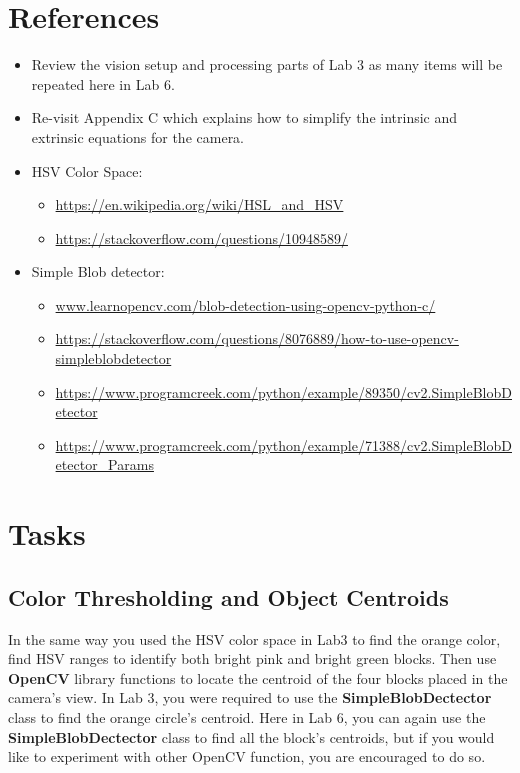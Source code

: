 \section{References}
\begin{itemize}
	\item Review the vision setup and processing parts of Lab 3 as many items will be repeated here in Lab 6.
	\item Re-visit Appendix C which explains how to simplify the intrinsic and extrinsic equations for the camera.
    \item HSV Color Space:
    \begin{itemize}
    \item \url{https://en.wikipedia.org/wiki/HSL_and_HSV}
    \item \href{https://stackoverflow.com/questions/10948589/choosing-the-correct-upper-and-lower-hsv-boundaries-for-color-detection-withcv}{https://stackoverflow.com/questions/10948589/}
    \end{itemize}
    
    \item Simple Blob detector:
    \begin{itemize}
    \item \url{www.learnopencv.com/blob-detection-using-opencv-python-c/}
    \item \href{https://stackoverflow.com/questions/8076889/}{https://stackoverflow.com/questions/8076889/how-to-use-opencv-simpleblobdetector}
    \item \url{https://www.programcreek.com/python/example/89350/cv2.SimpleBlobDetector}
    \item \url{https://www.programcreek.com/python/example/71388/cv2.SimpleBlobDetector_Params}
    \end{itemize}

\end{itemize}



\section{Tasks}
\subsection{Color Thresholding and Object Centroids}
In the same way you used the HSV color space in Lab3 to find the orange color, find HSV ranges to identify both bright pink and bright green blocks.  Then use \textbf{OpenCV} library functions to locate the centroid of the four blocks placed in the camera's view.  In Lab 3, you were required to use the \textbf{SimpleBlobDectector} class to find the orange circle’s centroid.  Here in Lab 6, you can again use the \textbf{SimpleBlobDectector} class to find all the block’s centroids, but if you would like to experiment with other OpenCV function, you are encouraged to do so.

